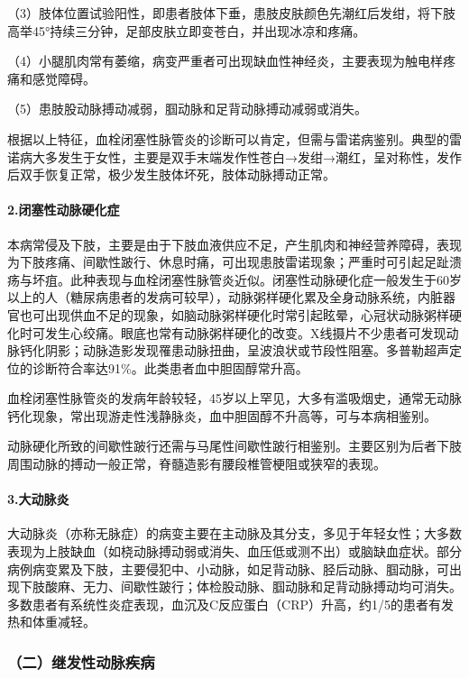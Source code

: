 （3）肢体位置试验阳性，即患者肢体下垂，患肢皮肤颜色先潮红后发绀，将下肢高举45°持续三分钟，足部皮肤立即变苍白，并出现冰凉和疼痛。

（4）小腿肌肉常有萎缩，病变严重者可出现缺血性神经炎，主要表现为触电样疼痛和感觉障碍。

（5）患肢股动脉搏动减弱，腘动脉和足背动脉搏动减弱或消失。

根据以上特征，血栓闭塞性脉管炎的诊断可以肯定，但需与雷诺病鉴别。典型的雷诺病大多发生于女性，主要是双手末端发作性苍白→发绀→潮红，呈对称性，发作后双手恢复正常，极少发生肢体坏死，肢体动脉搏动正常。

\paragraph{2.闭塞性动脉硬化症}

本病常侵及下肢，主要是由于下肢血液供应不足，产生肌肉和神经营养障碍，表现为下肢疼痛、间歇性跛行、休息时痛，可出现患肢雷诺现象；严重时可引起足趾溃疡与坏疽。此种表现与血栓闭塞性脉管炎近似。闭塞性动脉硬化症一般发生于60岁以上的人（糖尿病患者的发病可较早），动脉粥样硬化累及全身动脉系统，内脏器官也可出现供血不足的现象，如脑动脉粥样硬化时常引起眩晕，心冠状动脉粥样硬化时可发生心绞痛。眼底也常有动脉粥样硬化的改变。X线摄片不少患者可发现动脉钙化阴影；动脉造影发现罹患动脉扭曲，呈波浪状或节段性阻塞。多普勒超声定位的诊断符合率达91\%。此类患者血中胆固醇常升高。

血栓闭塞性脉管炎的发病年龄较轻，45岁以上罕见，大多有滥吸烟史，通常无动脉钙化现象，常出现游走性浅静脉炎，血中胆固醇不升高等，可与本病相鉴别。

动脉硬化所致的间歇性跛行还需与马尾性间歇性跛行相鉴别。主要区别为后者下肢周围动脉的搏动一般正常，脊髓造影有腰段椎管梗阻或狭窄的表现。

\paragraph{3.大动脉炎}

大动脉炎（亦称无脉症）的病变主要在主动脉及其分支，多见于年轻女性；大多数表现为上肢缺血（如桡动脉搏动弱或消失、血压低或测不出）或脑缺血症状。部分病例病变累及下肢，主要侵犯中、小动脉，如足背动脉、胫后动脉、腘动脉，可出现下肢酸麻、无力、间歇性跛行；体检股动脉、腘动脉和足背动脉搏动均可消失。多数患者有系统性炎症表现，血沉及C反应蛋白（CRP）升高，约1/5的患者有发热和体重减轻。

\subsubsection{（二）继发性动脉疾病}

